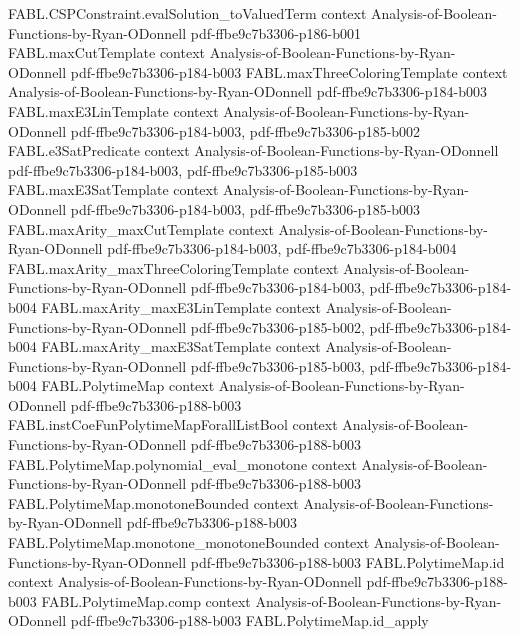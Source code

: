 \begin{theorem}
\proofstep
  {FABL.CSPConstraint.evalSolution_toValuedTerm}
  {context}
  {Analysis-of-Boolean-Functions-by-Ryan-ODonnell}
  {pdf-ffbe9c7b3306-p186-b001}
\proofstep
  {FABL.maxCutTemplate}
  {context}
  {Analysis-of-Boolean-Functions-by-Ryan-ODonnell}
  {pdf-ffbe9c7b3306-p184-b003}
\proofstep
  {FABL.maxThreeColoringTemplate}
  {context}
  {Analysis-of-Boolean-Functions-by-Ryan-ODonnell}
  {pdf-ffbe9c7b3306-p184-b003}
\proofstep
  {FABL.maxE3LinTemplate}
  {context}
  {Analysis-of-Boolean-Functions-by-Ryan-ODonnell}
  {pdf-ffbe9c7b3306-p184-b003,
    pdf-ffbe9c7b3306-p185-b002}
\proofstep
  {FABL.e3SatPredicate}
  {context}
  {Analysis-of-Boolean-Functions-by-Ryan-ODonnell}
  {pdf-ffbe9c7b3306-p184-b003,
    pdf-ffbe9c7b3306-p185-b003}
\proofstep
  {FABL.maxE3SatTemplate}
  {context}
  {Analysis-of-Boolean-Functions-by-Ryan-ODonnell}
  {pdf-ffbe9c7b3306-p184-b003,
    pdf-ffbe9c7b3306-p185-b003}
\proofstep
  {FABL.maxArity_maxCutTemplate}
  {context}
  {Analysis-of-Boolean-Functions-by-Ryan-ODonnell}
  {pdf-ffbe9c7b3306-p184-b003,
    pdf-ffbe9c7b3306-p184-b004}
\proofstep
  {FABL.maxArity_maxThreeColoringTemplate}
  {context}
  {Analysis-of-Boolean-Functions-by-Ryan-ODonnell}
  {pdf-ffbe9c7b3306-p184-b003,
    pdf-ffbe9c7b3306-p184-b004}
\proofstep
  {FABL.maxArity_maxE3LinTemplate}
  {context}
  {Analysis-of-Boolean-Functions-by-Ryan-ODonnell}
  {pdf-ffbe9c7b3306-p185-b002,
    pdf-ffbe9c7b3306-p184-b004}
\proofstep
  {FABL.maxArity_maxE3SatTemplate}
  {context}
  {Analysis-of-Boolean-Functions-by-Ryan-ODonnell}
  {pdf-ffbe9c7b3306-p185-b003,
    pdf-ffbe9c7b3306-p184-b004}
\proofstep
  {FABL.PolytimeMap}
  {context}
  {Analysis-of-Boolean-Functions-by-Ryan-ODonnell}
  {pdf-ffbe9c7b3306-p188-b003}
\proofstep
  {FABL.instCoeFunPolytimeMapForallListBool}
  {context}
  {Analysis-of-Boolean-Functions-by-Ryan-ODonnell}
  {pdf-ffbe9c7b3306-p188-b003}
\proofstep
  {FABL.PolytimeMap.polynomial_eval_monotone}
  {context}
  {Analysis-of-Boolean-Functions-by-Ryan-ODonnell}
  {pdf-ffbe9c7b3306-p188-b003}
\proofstep
  {FABL.PolytimeMap.monotoneBounded}
  {context}
  {Analysis-of-Boolean-Functions-by-Ryan-ODonnell}
  {pdf-ffbe9c7b3306-p188-b003}
\proofstep
  {FABL.PolytimeMap.monotone_monotoneBounded}
  {context}
  {Analysis-of-Boolean-Functions-by-Ryan-ODonnell}
  {pdf-ffbe9c7b3306-p188-b003}
\proofstep
  {FABL.PolytimeMap.id}
  {context}
  {Analysis-of-Boolean-Functions-by-Ryan-ODonnell}
  {pdf-ffbe9c7b3306-p188-b003}
\proofstep
  {FABL.PolytimeMap.comp}
  {context}
  {Analysis-of-Boolean-Functions-by-Ryan-ODonnell}
  {pdf-ffbe9c7b3306-p188-b003}
\proofstep
  {FABL.PolytimeMap.id_apply}

\end{theorem}
